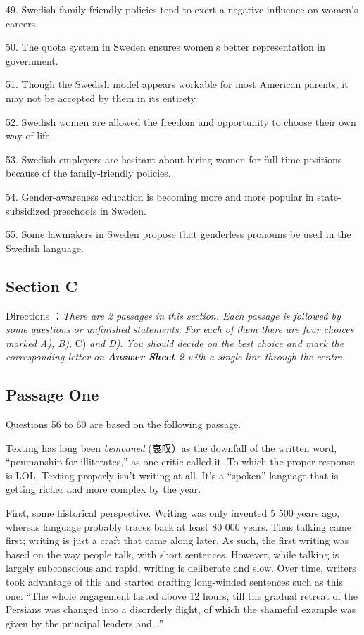\documentclass[UTF8,11pt]{ctexart}
\begin{document}
49. Swedish family-friendly policies tend to exert a negative influence on women’s careers.


50. The quota system in Sweden ensures women’s better representation in government.


51. Though the Swedish model appears workable for most American parents, it may not be accepted by them in its entirety.


52. Swedish women are allowed the freedom and opportunity to choose their own way of life.


53. Swedish employers are hesitant about hiring women for full-time positions because of the family-friendly policies.


54. Gender-awareness education is becoming more and more popular in state-subsidized preschools in Sweden.


55. Some lawmakers in Sweden propose that genderless pronouns be used in the Swedish language.


\subsection*{\textbf{Section C}}


Directions ：\textit{There are 2 passages in this section. Each passage is followed by some questions or unfinished statements}. \textit{For each of them there are four choices marked A), B),} C)\textit{ and D)}.\textit{ You should decide on the best choice and mark the} \textit{corresponding letter on}\textbf{\textit{ Answer Sheet 2}}\textit{ with a single line through the centre.}


\subsection*{Passage One}


Questions 56 to 60 are based on the following passage.


Texting has long been\textit{ bemoaned} (哀叹）as the downfall of the written word, “penmanship for illiterates,” as one critic called it. To which the proper response is LOL. Texting properly isn’t writing at all. It’s a “spoken” language that is getting richer and more complex by the year.


First, some historical perspective. Writing was only invented 5 500 years ago, whereas language probably traces back at least 80 000 years. Thus talking came first; writing is just a craft that came along later. As such, the first writing was based on the way people talk, with short sentences. However, while talking is largely subconscious and rapid, writing is deliberate and slow. Over time, writers took advantage of this and started crafting long-winded sentences such as this one: “The whole engagement lasted above 12 hours, till the gradual retreat of the Persians was changed into a disorderly flight, of which the shameful example was given by the principal leaders and...”
\end{document}
